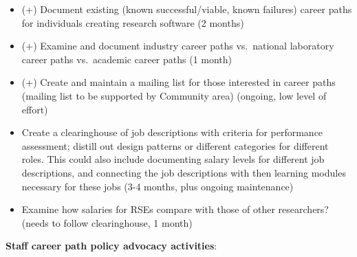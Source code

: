 \documentclass[
]{book}
\begin{document}
\begin{itemize}
\item
  (+) Document existing (known successful/viable, known failures) career paths for individuals
  creating research software (2 months)
\item
  (+) Examine and document industry career paths vs.~national laboratory career paths vs.~academic career paths (1 month)
\item
  (+) Create and maintain a mailing list for those interested in career paths (mailing list to be
  supported by Community area) (ongoing, low level of effort)
\item
  Create a clearinghouse of job descriptions with criteria for performance assessment; distill
  out design patterns or different categories for different roles. This could also include documenting
  salary levels for different job descriptions, and connecting the job descriptions with then learning
  modules necessary for these jobs (3-4 months, plus ongoing maintenance)
\item
  Examine how salaries for RSEs compare with those of other researchers? (needs to follow clearinghouse, 1 month)
\end{itemize}

\textbf{Staff career path policy advocacy activities}:
\end{document}
